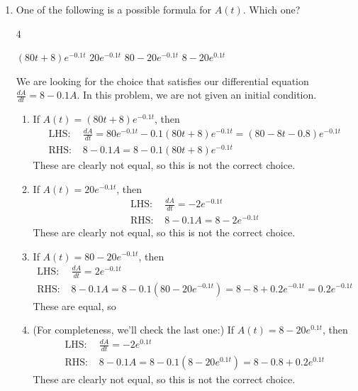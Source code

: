 \documentclass{article}
\begin{document}
\begin{enumerate}
\begin{enumerate}
  \item
    \begin{problem}[\vfill]
      One of the following is a possible formula for $A(t)$.  Which one?
      \begin{multicols}{4}
        \begin{enumerate}[label=\protect\maybecircle{\Alph*.}]
        \plainitem $(80 t + 8) e^{-0.1t}$
        \plainitem $20 e^{-0.1t}$
        \circleitem $80 - 20 e^{-0.1t}$
        \plainitem $8 - 20 e^{0.1t}$
        \end{enumerate}        
      \end{multicols}
    \end{problem}
 \begin{solution}
  We are looking for the choice that satisfies our differential
      equation $\frac{dA}{dt} = 8 - 0.1A$. In this problem, we are not given an initial condition. 
   

    \begin{enumerate}[label=\roman*.]
    \item If $A(t) = (80 t + 8) e^{-0.1t}$, then
      \begin{align*}
        \text{LHS: } &\frac{dA}{dt} = 80e^{-0.1t} -0.1 (80 t + 8) e^{-0.1t} = (80-8t-0.8)e^{-0.1t} \\
        \text{RHS: }& 8 - 0.1A  = 8 - 0.1(80 t + 8) e^{-0.1t}
      \end{align*}
      These are clearly not equal, so this is not the
      correct choice.

    \item If $A(t) = 20 e^{-0.1t}$, then
      \begin{align*}
        \text{LHS: }&\frac{dA}{dt} = -2 e^{-0.1t} \\
        \text{RHS: }& 8 - 0.1A = 8 -2 e^{-0.1t}
      \end{align*}
     These are clearly not equal, so this is not the
      correct choice.
      
    \item If $A(t) = 80 - 20 e^{-0.1t}$, then
      \begin{align*}
        \text{LHS: }&\frac{dA}{dt} = 2e^{-0.1t} \\
        \text{RHS: }&8 - 0.1A = 8  - 0.1\left(80 - 20 e^{-0.1t}\right) = 8 - 8 + 0.2e^{-0.1t} = 0.2e^{-0.1t}
      \end{align*}
      These are  equal, so 
\item (For completeness, we'll check the last one:) If $A(t) = 8 - 20 e^{0.1t}$, then
      \begin{align*}
        \text{LHS: }&\frac{dA}{dt} = -2 e^{0.1t} \\
        \text{RHS: }& 8 - 0.1A = 8  - 0.1\left(8 - 20 e^{0.1t}\right) = 8 - 0.8 + 0.2e^{0.1t}
      \end{align*}
     These are clearly not equal, so this is not the
      correct choice.
      

\end{enumerate}
\end{solution}
\end{enumerate}
\end{enumerate}
\end{document}
